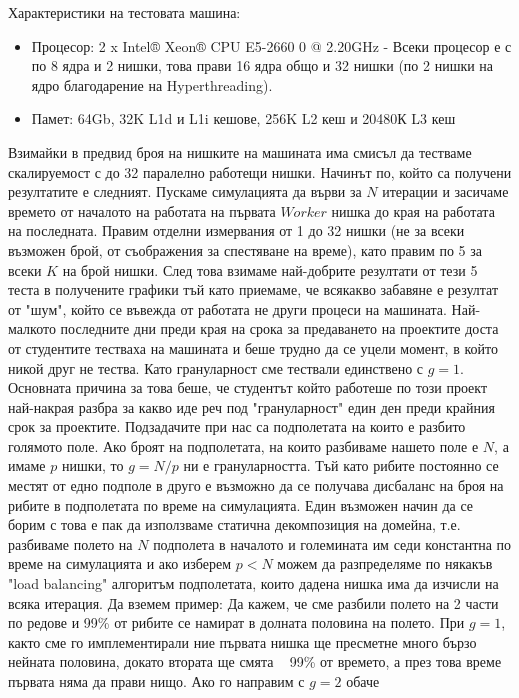 \documentclass[12pt]{article}
\begin{document}
Характеристики на тестовата машина: 
\begin{itemize}
	\item Процесор: 2 x Intel® Xeon® CPU E5-2660 0 @ 2.20GHz - Всеки процесор е с по 8 ядра и 2 нишки,
	това прави 16 ядра общо и 32 нишки (по 2 нишки на ядро благодарение на Hyperthreading).
	\item Памет: 64Gb, 32K L1d и L1i кешове, 256K L2 кеш и 20480К L3 кеш
\end{itemize}
Взимайки в предвид броя на нишките на машината има смисъл да тестваме скалируемост с до 32 паралелно работещи нишки.
\bigbreak
Начинът по, който са получени резултатите е следният. Пускаме симулацията да върви за $N$ итерации
и засичаме времето от началото на работата на първата $Worker$ нишка до края на работата на последната.
Правим отделни измервания от 1 до 32 нишки (не за всеки възможен брой, от съображения за
спестяване на време), като правим по 5 за всеки $K$ на брой нишки. След това
взимаме най-добрите резултати от тези 5 теста в получените графики тъй като приемаме, че всякакво забавяне е резултат от
"шум", който се въвежда от работата не други процеси на машината. Най-малкото последните дни преди края
на срока за предаването на проектите доста от студентите тестваха на машината и беше трудно да се уцели
момент, в който никой друг не тества.
\bigbreak
Като грануларност сме тествали единствено с $g = 1$. Основната причина за това беше, че студентът който работеше по
този проект най-накрая разбра за какво иде реч под "грануларност" един ден преди крайния срок за проектите.
Подзадачите при нас са подполетата на които е разбито голямото поле. Ако броят на подполетата,
на които разбиваме нашето поле е $N$, а имаме $p$ нишки, то $g = N/p$ ни е грануларността. Тъй като рибите постоянно
се местят от едно подполе в друго е възможно да се получава дисбаланс на броя на рибите в подполетата по време на симулацията.
Един възможен начин да се борим с това е пак да използваме статична декомпозиция на домейна, т.е. разбиваме
полето на $N$ подполета в началото и големината им седи константна по време на симулацията и ако изберем $p < N$ можем да разпределяме
по някакъв "load balancing" алгоритъм подполетата, които дадена нишка има да изчисли на всяка итерация.
Да вземем пример: Да кажем, че сме разбили полето на 2 части по редове и 99\% от рибите се намират в долната половина
на полето. При $g = 1$, както сме го имплементирали ние първата нишка ще пресметне много бързо нейната половина, докато
втората ще смята ~ 99\% от времето, а през това време първата няма да прави нищо. Ако го направим с $g = 2$ обаче
\end{document}
